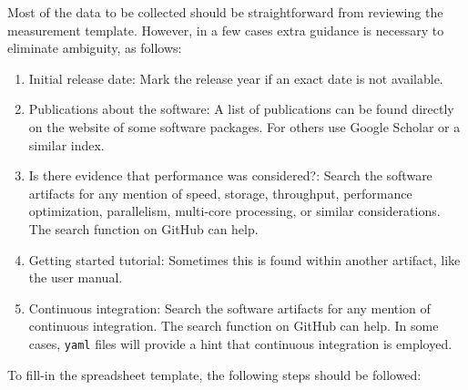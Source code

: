 \documentclass[letterpaper,cleveref]{lipics-v2019}
\begin{document}
Most of the data to be collected should be straightforward from reviewing the
measurement template.  However, in a few cases extra guidance is necessary
to eliminate ambiguity, as follows:

\begin{enumerate}
\item Initial release date: Mark the release year if an exact date is not
  available.
\item Publications about the software: A list of publications can be found
  directly on the website of some software packages. For others use Google
  Scholar or a similar index.
\item Is there evidence that performance was considered?: Search the software
  artifacts for any mention of speed, storage, throughput, performance
  optimization, parallelism, multi-core processing, or similar
  considerations. The search function on GitHub can help.
\item Getting started tutorial: Sometimes this is found within another artifact,
  like the user manual.
\item Continuous integration: Search the software artifacts for any mention of
  continuous integration. The search function on GitHub can help.  In some
  cases, \texttt{yaml} files will provide a hint that continuous integration is
  employed.
\end{enumerate}

\noindent To fill-in the spreadsheet template, the following steps should be followed:
\end{document}
